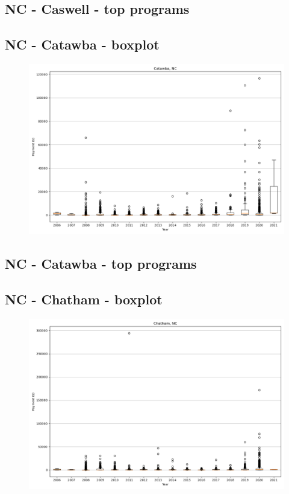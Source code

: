 \subsection*{NC - Caswell - top programs}

\newpage
\subsection*{NC - Catawba - boxplot}
\begin{figure}[h]
\centering
\includegraphics[width=7in]{../output/boxplots/counties/Catawba-NC_boxplot.png}
\end{figure}


\subsection*{NC - Catawba - top programs}

\newpage
\subsection*{NC - Chatham - boxplot}
\begin{figure}[h]
\centering
\includegraphics[width=7in]{../output/boxplots/counties/Chatham-NC_boxplot.png}
\end{figure}


